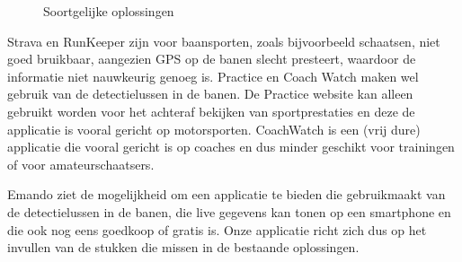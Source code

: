 \begin{figure}[ht]

\caption{Soortgelijke oplossingen}
\label{fig:soortgelijke-oplossingen}
\end{figure}

Strava en RunKeeper zijn voor baansporten, zoals bijvoorbeeld schaatsen, niet goed bruikbaar, aangezien GPS op de banen slecht presteert, waardoor de informatie niet nauwkeurig genoeg is. \mylaps Practice en Coach Watch maken wel gebruik van de detectielussen in de banen. De \mylaps Practice website kan alleen gebruikt worden voor het achteraf bekijken van sportprestaties en deze de applicatie is vooral gericht op motorsporten. CoachWatch is een (vrij dure) applicatie die vooral gericht is op coaches en dus minder geschikt voor trainingen of voor amateurschaatsers.

Emando ziet de mogelijkheid om een applicatie te bieden die gebruikmaakt van de detectielussen in de banen, die live gegevens kan tonen op een smartphone en die ook nog eens goedkoop of gratis is. Onze applicatie richt zich dus op het invullen van de stukken die missen in de bestaande oplossingen.